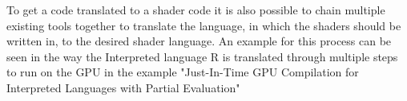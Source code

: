 To get a code translated to a shader code it is also possible to chain multiple existing tools together to translate the language, in which the shaders should be written in, to the desired shader language. An example for this process can be seen in the way the Interpreted language R is translated through multiple steps to run on the GPU in the example "Just-In-Time GPU Compilation for Interpreted Languages with Partial Evaluation"